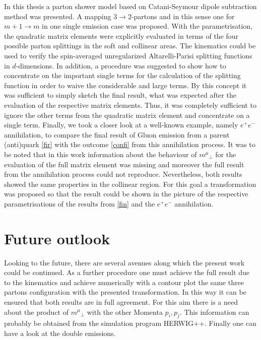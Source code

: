 In this thesis a parton shower model based on Catani-Seymour dipole subtraction method was presented.
A mapping $3\rightarrow 2 $-partons and in this sense one for $m+1\rightarrow m $ in one single emission case was proposed. With the parametrisation, the quadratic matrix elements were explicitly evaluated in terms of the four possible parton splittings in the soft and collinear areas. The kinematics could be used to verify the spin-averaged  unregularized  Altarelli-Parisi  splitting  functions  in $ d $-dimensions. In addition, a procedure was suggested to show how to concentrate on the important single terms for the calculation of the splitting function in order to waive the considerable and large terms. By this concept it was sufficient to simply sketch the final result, what was expected after the evaluation of the respective matrix elements. Thus, it was completely sufficient to ignore the other terms from the quadratic matrix element and concentrate on a single term. Finally, we took a closer look at a well-known example, namely $ e^{+}e^{-} $ annihilation, to compare the final result of Gluon emission from a parent (anti)quark \ref{fir} with the outcome \ref{confi} from this annihilation process. It was to be noted that in this work information about the behaviour of ${m^{\mu}}_{\bot}$ for the evaluation of the full matrix element was missing and moreover the full result from the annihilation process could not reproduce. Nevertheless, both results showed the same properties in the collinear region. For this goal a transformation was proposed so that the result could be shown in the picture of the respective parametrisations of the results from \ref{fin} and the $ e^{+}e^{-}$ annihilation. 

\section*{Future outlook}
Looking to the future, there are several avenues along which the present work could be continued. As a further procedure one must achieve the full result due to the kinematics and achieve numerically with a contour plot the same three partons configuration with the presented transformation. In this way it can be ensured that both results are in full agreement. For this aim there is a need about the product of ${m^{\mu}}_{\bot}$ with the other Momenta $ p_i, p_j $. This information can probably be obtained from the simulation program HERWIG++. Finally one can have a look at the double emissions.